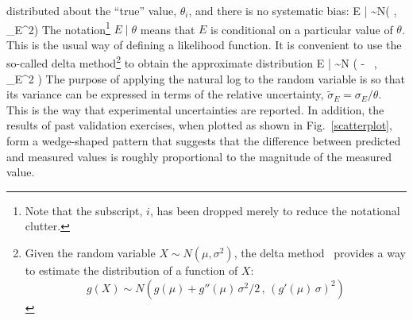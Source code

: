 distributed about the ``true'' value, $\theta_i$, and there is no systematic bias:
\be
   E \; | \; \theta \sim N(\theta \; , \; \sigma_E^2) \label{expunc}
\ee
The notation\footnote{Note that the subscript, $i$, has been dropped merely to reduce the notational clutter.}
$E \; | \; \theta$ means that $E$ is conditional on a particular value of $\theta$.
This is the usual way of defining a likelihood function.
It is convenient to use the so-called delta method\footnote{Given the random variable $X \sim N(\mu,\sigma^2)$, the
delta method~\cite{Oehlert:1992} provides a way to estimate the distribution of a function of $X$:
\[g(X) \sim N \left( g(\mu) + g''(\mu) \, \sigma^2/2 \, , \, (g'(\mu) \, \sigma)^2\right)\]} to obtain the approximate distribution
\be
   \ln E \; | \; \theta \sim N \left( \ln \theta -  \, , \,\widetilde{\sigma}_E^2 \right) \label{eeq}
\ee
The purpose of applying the natural log to the random variable is so that its variance can be expressed in terms of the
relative uncertainty, $\widetilde{\sigma}_E=\sigma_E/\theta$. This is the way that experimental uncertainties are reported. In addition,
the results of past validation exercises, when plotted as shown in Fig.~\ref{scatterplot}, form a wedge-shaped pattern that suggests
that the difference between predicted and measured values is roughly proportional to the magnitude of the measured value.

